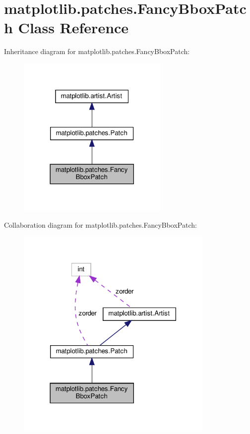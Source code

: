 \hypertarget{classmatplotlib_1_1patches_1_1FancyBboxPatch}{}\section{matplotlib.\+patches.\+Fancy\+Bbox\+Patch Class Reference}
\label{classmatplotlib_1_1patches_1_1FancyBboxPatch}


Inheritance diagram for matplotlib.\+patches.\+Fancy\+Bbox\+Patch\+:
\nopagebreak
\begin{figure}[H]
\begin{center}
\leavevmode
\includegraphics[width=206pt]{classmatplotlib_1_1patches_1_1FancyBboxPatch__inherit__graph}
\end{center}
\end{figure}


Collaboration diagram for matplotlib.\+patches.\+Fancy\+Bbox\+Patch\+:
\nopagebreak
\begin{figure}[H]
\begin{center}
\leavevmode
\includegraphics[width=270pt]{classmatplotlib_1_1patches_1_1FancyBboxPatch__coll__graph}
\end{center}
\end{figure}
